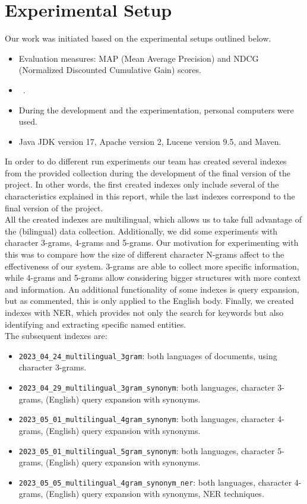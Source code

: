 \section{Experimental Setup}\label{sec:setup}

Our work was initiated based on the experimental setups outlined below.
\begin{itemize}
	\item Evaluation measures: MAP (Mean Average Precision) and NDCG (Normalized Discounted Cumulative Gain) scores.
	\item~\citep[Repository]{jihuming}.
	\item During the development and the experimentation, personal computers were used.
	\item Java JDK version 17, Apache version 2, Lucene version 9.5, and Maven.
\end{itemize}

In order to do different run experiments our team has created several indexes from the provided collection during the
development of the final version of the project.
In other words, the first created indexes only include several of the characteristics explained in this report, while
the last indexes correspond to the final version of the project.\\

All the created indexes are multilingual, which allows us to take full advantage of the (bilingual) data collection.
Additionally, we did some experiments with character 3-grams, 4-grams and 5-grams.
Our motivation for experimenting with this was to compare how the size of different character N-grams affect to the
effectiveness of our system.
3-grams are able to collect more specific information, while 4-grams and 5-grams allow considering bigger structures
with more context and information.
An additional functionality of some indexes is query expansion, but as commented, this is only applied to the English
body.
Finally, we created indexes with NER, which provides not only the search for keywords but also identifying and
extracting specific named entities.\\

The subsequent indexes are:
\begin{itemize}
	\item \texttt{2023\_04\_24\_multilingual\_3gram}: both languages of documents, using character 3-grams.
	\item \texttt{2023\_04\_29\_multilingual\_3gram\_synonym}: both languages, character 3-grams, (English) query expansion with synonyms.
	\item \texttt{2023\_05\_01\_multilingual\_4gram\_synonym}: both languages, character 4-grams, (English) query expansion with synonyms.
	\item \texttt{2023\_05\_01\_multilingual\_5gram\_synonym}: both languages, character 5-grams, (English) query expansion with synonyms.
	\item \texttt{2023\_05\_05\_multilingual\_4gram\_synonym\_ner}: both languages, character 4-grams, (English) query expansion with synonyms, NER techniques.
\end{itemize}

